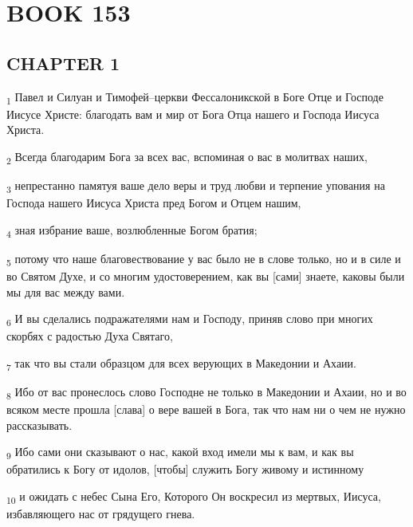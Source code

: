 \section{BOOK 153}
\subsection{CHAPTER 1}
\begin{tcolorbox}
\textsubscript{1} Павел и Силуан и Тимофей--церкви Фессалоникской в Боге Отце и Господе Иисусе Христе: благодать вам и мир от Бога Отца нашего и Господа Иисуса Христа.
\end{tcolorbox}
\begin{tcolorbox}
\textsubscript{2} Всегда благодарим Бога за всех вас, вспоминая о вас в молитвах наших,
\end{tcolorbox}
\begin{tcolorbox}
\textsubscript{3} непрестанно памятуя ваше дело веры и труд любви и терпение упования на Господа нашего Иисуса Христа пред Богом и Отцем нашим,
\end{tcolorbox}
\begin{tcolorbox}
\textsubscript{4} зная избрание ваше, возлюбленные Богом братия;
\end{tcolorbox}
\begin{tcolorbox}
\textsubscript{5} потому что наше благовествование у вас было не в слове только, но и в силе и во Святом Духе, и со многим удостоверением, как вы [сами] знаете, каковы были мы для вас между вами.
\end{tcolorbox}
\begin{tcolorbox}
\textsubscript{6} И вы сделались подражателями нам и Господу, приняв слово при многих скорбях с радостью Духа Святаго,
\end{tcolorbox}
\begin{tcolorbox}
\textsubscript{7} так что вы стали образцом для всех верующих в Македонии и Ахаии.
\end{tcolorbox}
\begin{tcolorbox}
\textsubscript{8} Ибо от вас пронеслось слово Господне не только в Македонии и Ахаии, но и во всяком месте прошла [слава] о вере вашей в Бога, так что нам ни о чем не нужно рассказывать.
\end{tcolorbox}
\begin{tcolorbox}
\textsubscript{9} Ибо сами они сказывают о нас, какой вход имели мы к вам, и как вы обратились к Богу от идолов, [чтобы] служить Богу живому и истинному
\end{tcolorbox}
\begin{tcolorbox}
\textsubscript{10} и ожидать с небес Сына Его, Которого Он воскресил из мертвых, Иисуса, избавляющего нас от грядущего гнева.
\end{tcolorbox}
